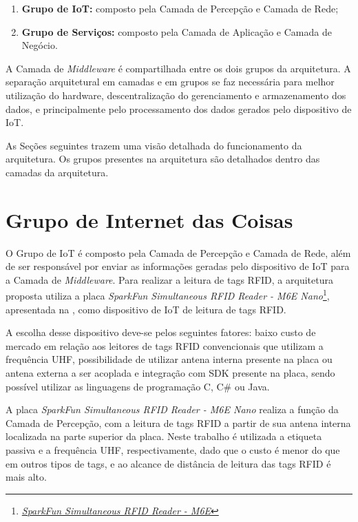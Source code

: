 \begin{enumerate}
    \item \textbf{Grupo de \acrlong{IoT}:} composto pela Camada de Percepção e Camada de Rede;
    \item \textbf{Grupo de Serviços:} composto pela Camada de Aplicação e Camada de Negócio.
\end{enumerate}

A Camada de \textit{Middleware} é compartilhada entre os dois grupos da arquitetura. A separação arquitetural em camadas e em grupos se faz necessária para melhor utilização do hardware, descentralização do gerenciamento e armazenamento dos dados, e principalmente pelo processamento dos dados gerados pelo dispositivo de \acrshort{IoT}.

As Seções seguintes trazem uma visão detalhada do funcionamento da arquitetura. Os grupos presentes na arquitetura são detalhados dentro das camadas da arquitetura.

\section{Grupo de Internet das Coisas}
\label{sec:grupo-iot}

O Grupo de \acrlong{IoT} é composto pela Camada de Percepção e Camada de Rede, além de ser responsável por enviar as informações geradas pelo dispositivo de \acrshort{IoT} para a Camada de \textit{Middleware}. Para realizar a leitura de tags \acrshort{RFID}, a arquitetura proposta utiliza a placa \textit{SparkFun Simultaneous RFID Reader - M6E Nano}\footnote{\emph{\href{https://www.sparkfun.com/products/14066?_ga=2.72983187.1285336078.1513642010-752141075.1513642010}{SparkFun Simultaneous RFID Reader - M6E}}}, apresentada na , como dispositivo de \acrshort{IoT} de leitura de tags \acrshort{RFID}.

A escolha desse dispositivo deve-se pelos seguintes fatores: baixo custo de mercado em relação aos leitores de tags \acrshort{RFID} convencionais que utilizam a frequência \acrshort{UHF}, possibilidade de utilizar antena interna presente na placa ou antena externa a ser acoplada e integração com \acrshort{SDK} presente na placa, sendo possível utilizar as linguagens de programação C, C\# ou Java.

A placa \textit{SparkFun Simultaneous RFID Reader - M6E Nano} realiza a função da Camada de Percepção, com a leitura de tags \acrshort{RFID} a partir de sua antena interna localizada na parte superior da placa. Neste trabalho é utilizada a etiqueta passiva e a frequência \acrshort{UHF}, respectivamente, dado que o custo é menor do que em outros tipos de tags, e ao alcance de distância de leitura das tags \acrshort{RFID} é mais alto.

